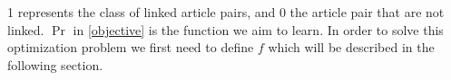 1 represents the class of linked article pairs, and 0 the article pair that are not linked. $\Pr$ in \cref{objective} is the function we aim to learn. In order to solve this optimization problem we first need to define $f$ which will be described in the following section.








